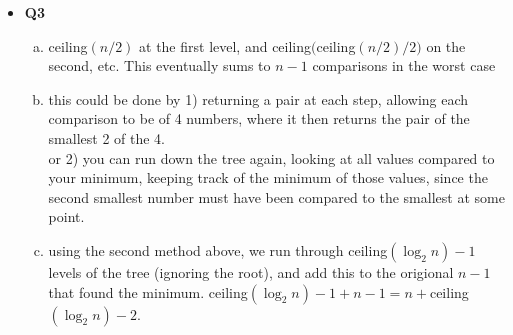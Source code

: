 \documentclass[11pt]{article}
\begin{document}
\begin{itemize}
\vspace{0.1in}

\item \textbf{Q3} 
\begin{enumerate}[(a)]
\item ceiling$(n/2)$ at the first level, and ceiling$($ceiling$(n/2)$$/2)$ on the second, etc. This eventually sums to $n-1$ comparisons in the worst case
\item this could be done by 1) returning a pair at each step, allowing each comparison to be of 4 numbers, where it then returns the pair of the smallest 2 of the 4. 
\\or 2) you can run down the tree again, looking at all values compared to your minimum, keeping track of the minimum of those values, since the second smallest number must have been compared to the smallest at some point.
\item using the second method above, we run through ceiling$(\log_2 n)-1$ levels of the tree (ignoring the root), and add this to the origional $n-1$ that found the minimum. ceiling$(\log_2 n)-1 + n-1 = n + $ceiling$(\log_2 n)-2$.
\end{enumerate}

\end{itemize}
\end{document}

